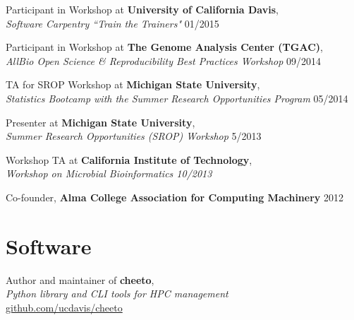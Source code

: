 \documentclass[resmargin,12pt]{camille_resume}
\begin{document}
\begin{resume}
\begin{list1}
\item[] Participant in Workshop at {\bf University of California Davis},\\
{\em Software Carpentry ``Train the Trainers" } \hfill 01/2015\\

\item[] Participant in Workshop at {\bf The Genome Analysis Center (TGAC)},\\
{\em AllBio Open Science \& Reproducibility Best Practices Workshop} \hfill 09/2014\\

\item[] TA for SROP Workshop at {\bf Michigan State University}, \\
{\em Statistics Bootcamp with the Summer Research Opportunities Program} \hfill 05/2014\\

\item[] Presenter at {\bf Michigan State University},\\
{\em Summer Research Opportunities (SROP) Workshop} \hfill 5/2013\\

\item[] Workshop TA at {\bf California Institute of Technology},\\
\em{Workshop on Microbial Bioinformatics} \hfill 10/2013\\

\item[] Co-founder, {\bf Alma College Association for Computing Machinery} \hfill 2012\\


\end{list1}


    \section{\mysidestyle Software}

\begin{list1}

\item[] Author and maintainer of {\bf cheeto},\\
{\em Python library and CLI tools for HPC management}\\
\hfill \href{https://github.com/ucdavis/cheeto}{github.com/ucdavis/cheeto}\\


\end{list1}
\end{resume}
\end{document}
